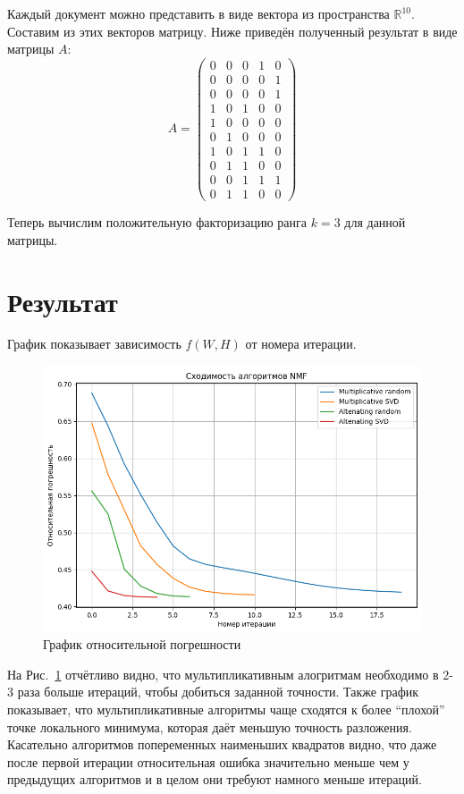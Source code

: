 \documentclass[14pt]{extarticle}
\begin{document}
Каждый документ можно представить в виде вектора из пространства $\mathbb{R}^{10}$. Составим из этих векторов матрицу. Ниже приведён полученный результат в виде матрицы $A$:
$$
A =
\begin{pmatrix}
0 & 0 & 0 & 1 & 0 \\ 
0 & 0 & 0 & 0 & 1 \\
0 & 0 & 0 & 0 & 1 \\ 
1 & 0 & 1 & 0 & 0 \\ 
1 & 0 & 0 & 0 & 0 \\ 
0 & 1 & 0 & 0 & 0 \\ 
1 & 0 & 1 & 1 & 0 \\
0 & 1 & 1 & 0 & 0 \\ 
0 & 0 & 1 & 1 & 1 \\ 
0 & 1 & 1 & 0 & 0
\end{pmatrix}
$$

Теперь вычислим положительную факторизацию ранга $k=3$ для данной матрицы.

\newpage


\section{Результат}

График показывает зависимость $f(W, H)$ от номера итерации.

\begin{figure}[h]
  \includegraphics[width=\linewidth]{assets/Graph1.png}
  \caption{График относительной погрешности}
  \label{fig:relativeApproximationError}
\end{figure}

На Рис.~\ref{fig:relativeApproximationError} отчётливо видно, что мультипликативным алогритмам необходимо в 2-3 раза больше итераций, чтобы добиться заданной точности. Также график показывает, что мультипликативные алгоритмы чаще сходятся к более ``плохой'' точке локального минимума, которая даёт меньшую точность разложения. Касательно алгоритмов попеременных наименьших квадратов видно, что даже после первой итерации относительная ошибка значительно меньше чем у предыдущих алгоритмов и в целом они требуют намного меньше итераций.
\end{document}
